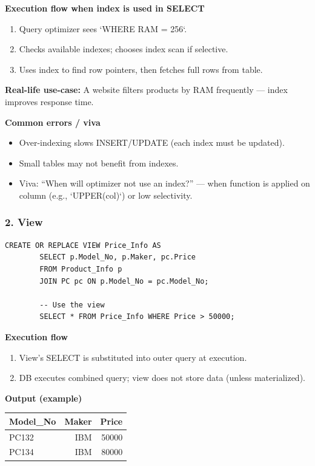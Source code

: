 \documentclass[11pt,a4paper]{article}
\begin{document}
	\textbf{Execution flow when index is used in SELECT}
	\begin{enumerate}[noitemsep]
		\item Query optimizer sees `WHERE RAM = 256`.  
		\item Checks available indexes; chooses index scan if selective.  
		\item Uses index to find row pointers, then fetches full rows from table.  
	\end{enumerate}
	
	\textbf{Real-life use-case:} A website filters products by RAM frequently — index improves response time.
	
	\textbf{Common errors / viva}
	\begin{itemize}[noitemsep]
		\item Over-indexing slows INSERT/UPDATE (each index must be updated).  
		\item Small tables may not benefit from indexes.  
		\item Viva: ``When will optimizer not use an index?'' — when function is applied on column (e.g., `UPPER(col)`) or low selectivity.
	\end{itemize}
	
	\bigskip
	\subsubsection*{2. View}
	\begin{lstlisting}[caption={Create and query a view}]
		CREATE OR REPLACE VIEW Price_Info AS
		SELECT p.Model_No, p.Maker, pc.Price
		FROM Product_Info p
		JOIN PC pc ON p.Model_No = pc.Model_No;
		
		-- Use the view
		SELECT * FROM Price_Info WHERE Price > 50000;
	\end{lstlisting}
	
	\textbf{Execution flow}
	\begin{enumerate}[noitemsep]
		\item View's SELECT is substituted into outer query at execution.  
		\item DB executes combined query; view does not store data (unless materialized).  
	\end{enumerate}
	
	\textbf{Output (example)}
	\begin{center}
		\begin{tabular}{lrr}
			\toprule
			Model\_No & Maker & Price \\
			\midrule
			PC132 & IBM & 50000 \\
			PC134 & IBM & 80000 \\
			\bottomrule
		\end{tabular}
	\end{center}
	
\end{document}
